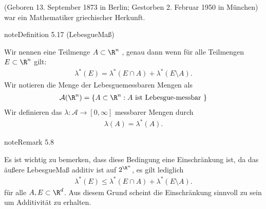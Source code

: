 \documentclass[letterpaper,10pt,german]{jupyterBook}
\begin{document}
\begin{sphinxShadowBox}

\sphinxAtStartPar
{} (Geboren 13. September 1873 in Berlin; Gestorben 2. Februar 1950 in München) war ein Mathematiker griechischer Herkunft.
\end{sphinxShadowBox}
\label{masstheorie/masstheorie:definition-41}
\begin{sphinxadmonition}{note}{Definition 5.17 (Lebesgue\sphinxhyphen{}Maß)}



\sphinxAtStartPar
Wir nennen eine Teilmenge \(A \subset \R^n\) , genau dann wenn für alle Teilmengen \(E \subset \R^n\) gilt:
\begin{equation*}
\begin{split}\lambda^*(E) = \lambda^*(E \cap A) + \lambda^*(E \setminus A).\end{split}
\end{equation*}
\sphinxAtStartPar
Wir notieren die Menge der Lebesgue\sphinxhyphen{}messbaren Mengen als
\begin{equation*}
\begin{split}\mathcal{A}(\R^n) = \lbrace A \subset \R^n : A \text{ ist Lebesgue-messbar } \rbrace\end{split}
\end{equation*}
\sphinxAtStartPar
Wir definieren das  \(\lambda \colon \mathcal{A} \rightarrow [0,\infty]\) messbarer Mengen durch
\begin{equation*}
\begin{split}\lambda(A) = \lambda^*(A).\end{split}
\end{equation*}\end{sphinxadmonition}
\label{masstheorie/masstheorie:remark-42}
\begin{sphinxadmonition}{note}{Remark 5.8}



\sphinxAtStartPar
Es ist wichtig zu bemerken, dass diese Bedingung eine Einschränkung ist, da das äußere Lebesgue\sphinxhyphen{}Maß  additiv ist auf \(2^{\R^n}\), es gilt lediglich
\begin{equation*}
\begin{split}\lambda^*(E) \leq \lambda^*(E \cap A) + \lambda^*(E \setminus A).\end{split}
\end{equation*}
\sphinxAtStartPar
für alle \(A,E\subset\R^d\). Aus diesem Grund scheint die Einschränkung sinnvoll zu sein um Additivität zu erhalten.
\end{sphinxadmonition}
\end{document}
